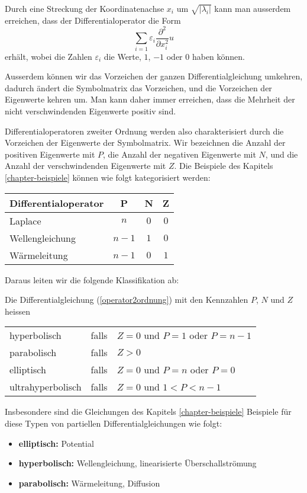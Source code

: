 Durch eine Streckung der Koordinatenachse $x_i$ um $\sqrt{|\lambda_i|}$
kann man ausserdem erreichen, dass der Differentialoperator die
Form
\[
\sum_{i=1}\varepsilon_i\frac{\partial^2}{\partial x_i^2}u
\]
erhält, wobei die Zahlen $\varepsilon_i$ die Werte, $1$, $-1$ oder $0$
haben können.

Ausserdem können wir das Vorzeichen der ganzen Differentialgleichung
umkehren, dadurch ändert die Symbolmatrix das Vorzeichen, und die
Vorzeichen der Eigenwerte kehren um.
Man kann daher immer erreichen, dass die Mehrheit der nicht
verschwindenden Eigenwerte positiv sind.

Differentialoperatoren zweiter Ordnung werden also charakterisiert durch
die Vorzeichen der Eigenwerte der Symbolmatrix. Wir bezeichnen die Anzahl
der positiven Eigenwerte mit $P$, die Anzahl der negativen Eigenwerte
mit $N$, und die Anzahl der verschwindenden Eigenwerte mit $Z$.
Die Beispiele des Kapitels \ref{chapter-beispiele} können wie
folgt kategorisiert werden:
\begin{center}
\begin{tabular}{l|ccc}
Differentialoperator&P&N&Z
\\
\hline
Laplace&
$n$&$0$&$0$
\\
Wellengleichung&
$n-1$&$1$&$0$
\\
Wärmeleitung&
$n-1$&$0$&$1$
\end{tabular}
\end{center}
Daraus leiten wir die folgende Klassifikation ab:

\begin{definition} Die Differentialgleichung 
(\ref{operator2ordnung})
mit den Kennzahlen $P$, $N$ und $Z$ heissen
\begin{center}
\begin{tabular}{lcl}
hyperbolisch&falls&$Z=0$ und $P=1$ oder $P=n-1$\\
parabolisch&falls&$Z>0$\\
elliptisch&falls&$Z=0$ und $P=n$ oder $P=0$\\
ultrahyperbolisch&falls&$Z=0$ und $1<P<n-1$
\end{tabular}
\end{center}
\end{definition}
Insbesondere sind die Gleichungen des Kapitels \ref{chapter-beispiele}
Beispiele für diese Typen von partiellen Differentialgleichungen
wie folgt:
\begin{itemize}
\item {\bf elliptisch:} Potential
\item {\bf hyperbolisch:} Wellengleichung, linearisierte Überschallströmung
\item {\bf parabolisch:} Wärmeleitung, Diffusion
\end{itemize}


